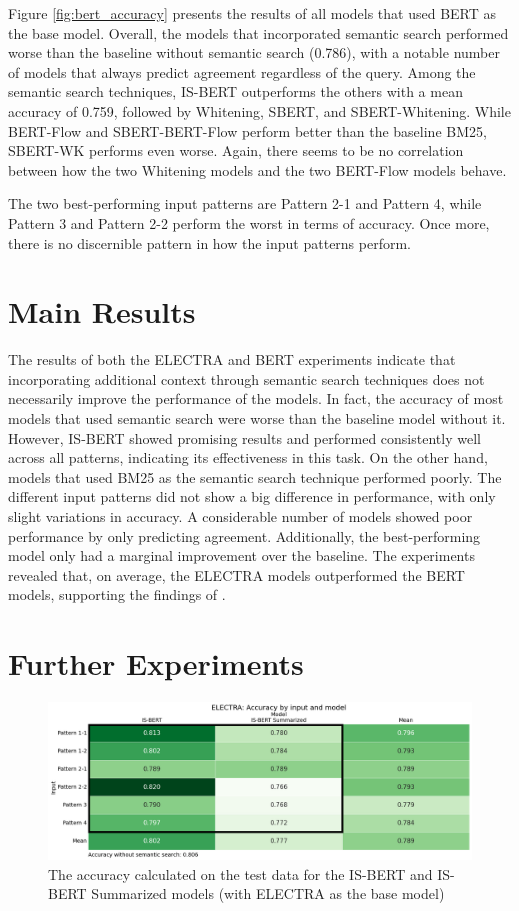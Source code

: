 Figure \ref{fig:bert_accuracy} presents the results of all models that used BERT as the base model. Overall, the models that incorporated semantic search performed worse than the baseline without semantic search (0.786), with a notable number of models that always predict agreement regardless of the query. Among the semantic search techniques, IS-BERT outperforms the others with a mean accuracy of 0.759, followed by Whitening, SBERT, and SBERT-Whitening. While BERT-Flow and SBERT-BERT-Flow perform better than the baseline BM25, SBERT-WK performs even worse. Again, there seems to be no correlation between how the two Whitening models and the two BERT-Flow models behave.

The two best-performing input patterns are Pattern 2-1 and Pattern 4, while Pattern 3 and Pattern 2-2 perform the worst in terms of accuracy. Once more, there is no discernible pattern in how the input patterns perform.

\section{Main Results}

The results of both the ELECTRA and BERT experiments indicate that incorporating additional context through semantic search techniques does not necessarily improve the performance of the models. In fact, the accuracy of most models that used semantic search were worse than the baseline model without it. However, IS-BERT showed promising results and performed consistently well across all patterns, indicating its effectiveness in this task. On the other hand, models that used BM25 as the semantic search technique performed poorly. The different input patterns did not show a big difference in performance, with only slight variations in accuracy. A considerable number of models showed poor performance by only predicting agreement. Additionally, the best-performing model only had a marginal improvement over the baseline. The experiments revealed that, on average, the ELECTRA models outperformed the BERT models, supporting the findings of \citet{witte_2022}.

\section{Further Experiments}

\begin{figure}[h]
\centering
\includegraphics[width = 1\linewidth]{figures/electra_summary_accuracy.png}
\caption{The accuracy calculated on the test data for the IS-BERT and IS-BERT Summarized models (with ELECTRA as the base model)}
\label{fig:electra_summary_accuracy}
\end{figure}

